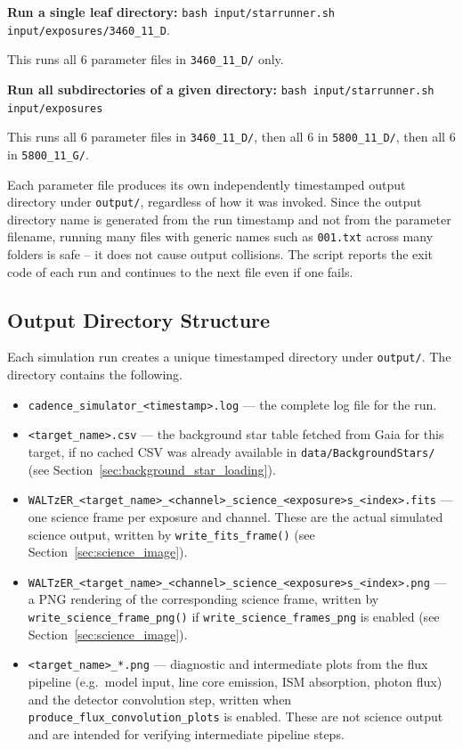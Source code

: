 \textbf{Run a single leaf directory:} \texttt{bash input/starrunner.sh input/exposures/3460\_11\_D}.

This runs all 6 parameter files in \texttt{3460\_11\_D/} only.

\vspace{10pt}
\textbf{Run all subdirectories of a given directory:} \texttt{bash input/starrunner.sh input/exposures}

This runs all 6 parameter files in \texttt{3460\_11\_D/}, then all 6 in \texttt{5800\_11\_D/}, then all 6 in \texttt{5800\_11\_G/}.

\medskip
\noindent Each parameter file produces its own independently timestamped output directory under \texttt{output/}, regardless of how it was invoked. Since the output directory name is generated from the run timestamp and not from the parameter filename, running many files with generic names such as \texttt{001.txt} across many folders is safe -- it does not cause output collisions. The script reports the exit code of each run and continues to the next file even if one fails.

\subsection{Output Directory Structure}
\label{sec:output_structure}

Each simulation run creates a unique timestamped directory under \texttt{output/}. The directory contains the following.

\begin{itemize}
    \item \texttt{cadence\_simulator\_<timestamp>.log} --- the complete log file for the run.

    \item \texttt{<target\_name>.csv} --- the background star table fetched from Gaia for this target, if no cached CSV was already available in \texttt{data/BackgroundStars/} (see Section~\ref{sec:background_star_loading}).

    \item \texttt{WALTzER\_<target\_name>\_<channel>\_science\_<exposure>s\_<index>.fits} --- one science frame per exposure and channel. These are the actual simulated science output, written by \texttt{write\_fits\_frame()} (see Section~\ref{sec:science_image}).

    \item \texttt{WALTzER\_<target\_name>\_<channel>\_science\_<exposure>s\_<index>.png} --- a PNG rendering of the corresponding science frame, written by \texttt{write\_science\_frame\_png()} if \texttt{write\_science\_frames\_png} is enabled (see Section~\ref{sec:science_image}).

    \item \texttt{<target\_name>\_*.png} --- diagnostic and intermediate plots from the flux pipeline (e.g.\ model input, line core emission, ISM absorption, photon flux) and the detector convolution step, written when \texttt{produce\_flux\_convolution\_plots} is enabled. These are not science output and are intended for verifying intermediate pipeline steps.
\end{itemize}

